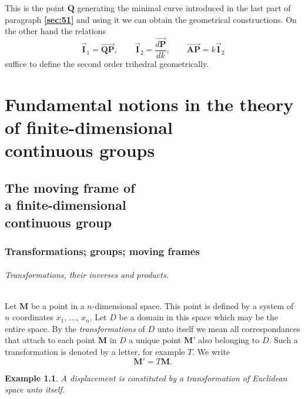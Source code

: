 \documentclass[leqno,11pt]{book}
\numberwithin{equation}{chapter}
\theoremstyle{shape1}
\theoremstyle{shapesmall}
\newtheorem*{ex}{Example}
\newcommand{\fsref}[1]{{\rm\textsection\textbf{\ref{sec:#1}}}}
\newcommand{\rvec}[1]{\vec{\mathbf{#1}}}
\newcommand{\ivec}{\rvec{I}}
\begin{document}
This is the point $\mathbf{Q}$ generating the minimal curve introduced in the last part of paragraph \fsref{51} and using it we can obtain the geometrical constructions. On the other hand the relations
\[
\ivec_{1}=\overrightarrow{\mathbf{QP}},\qquad\ivec_{2}=\frac{\overrightarrow{d\mathbf{P}}}{dk},\qquad\overrightarrow{\mathbf{AP}}=k\ivec_{2}
\]
suffice to define the second order trihedral geometrically.


\part[{Fundamental notions in the theory of finite-dimensional
  continuous groups}]{Fundamental notions in the theory of
  finite-dimensional\\ continuous groups}
\label{part:first-notions-theory}

\chapter[{The moving frame of a finite-dimensional continuous group}]{The moving frame of\\a finite-dimensional\\continuous group}
\label{cha:moving-frame-finite}

\section{Transformations; groups; moving frames}
\label{sec:transf-group-moving}
\paragraph{Transformations, their inverses and products.}
\label{sec:58}
Let $\mathbf{M}$ be a point in a $n$-dimensional space. This point is defined by a system of $n$ coordinates $x_{1}$, $\dots$, $x_{n}$. Let $D$ be a domain in this space which may be the entire space. By the \emph{transformations} of $D$ unto itself we mean all correspondances that attach to each point $\mathbf{M}$ in $D$ a unique point $\mathbf{M}'$ also belonging to $D$. Such a transformation is denoted by a letter, for example $T$. We write
\[
\mathbf{M}'=T\mathbf{M}.
\]

\begin{ex}
  A displacement is constituted by a transformation of Euclidean space unto itself.
\end{ex}
\end{document}
